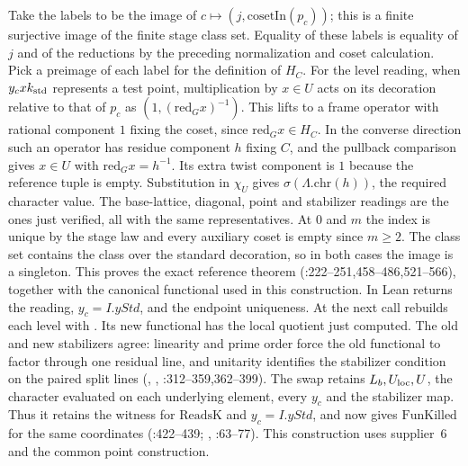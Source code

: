 Take the labels to be the image of $c\mapsto(j,\mathrm{cosetIn}(p_c))$;
this is a finite surjective image of the finite stage class set. Equality
of these labels is equality of $j$ and of the reductions by the preceding
normalization and coset calculation. Pick a preimage of each label for
the definition of $H_C$. For the level reading, when $y_c x k_{\rm std}$
represents a test point, multiplication by $x\in U$ acts on its decoration
relative to that of $p_c$ as $(1,(\mathrm{red}_G x)^{-1})$. This lifts
to a frame operator with rational component $1$ fixing the coset, since
$\mathrm{red}_G x\in H_C$. In the converse direction such an operator
has residue component $h$ fixing $C$, and the pullback comparison gives
$x\in U$ with $\mathrm{red}_G x=h^{-1}$. Its extra twist component is $1$
because the reference tuple is empty. Substitution in $\chi_U$ gives
$\sigma(\Lambda.\mathrm{chr}(h))$, the required character value.
The base-lattice, diagonal, point and stabilizer readings are the ones
just verified, all with the same representatives. At $0$ and $m$ the
index is unique by the stage law and every auxiliary coset is empty since
$m\ge2$. The class set contains the class over the standard decoration,
so in both cases the image is a singleton. This proves the exact
reference theorem 
(:222--251,458--486,521--566), together
with the canonical functional used in this construction. In Lean
 returns the reading, $y_c=I.yStd$, and
the endpoint uniqueness. At the next call 
rebuilds each level with . Its new functional has the
local quotient just computed. The old and new stabilizers agree:
linearity and prime order force the old functional to factor through
one residual line, and unitarity identifies the stabilizer condition on
the paired split lines (, ,
:312--359,362--399). The swap retains
$L_b,U_{\rm loc},U$, the character evaluated on each underlying
element, every $y_c$ and the stabilizer map. Thus it retains the
witness for $\mathrm{ReadsK}$ and $y_c=I.yStd$, and now gives
$\mathrm{FunKilled}$ for the same coordinates
(:422--439;
, :63--77).
This construction uses supplier~6 and the common point construction.

